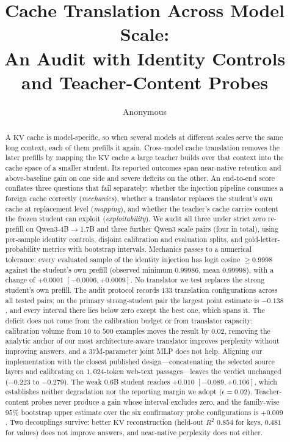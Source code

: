\documentclass{article} %
\title{Cache Translation Across Model Scale:\\
An Audit with Identity Controls and Teacher-Content Probes}
\author{Anonymous}
\date{}
\newcommand{\kv}{\ensuremath{\mathrm{KV}}}
\begin{document}
\maketitle

\begin{abstract}
A \kv{} cache is model-specific, so when several models at different scales
serve the same long context, each of them prefills it again. Cross-model cache
translation removes the later prefills by mapping the \kv{} cache a large
teacher builds over that context into the cache space of a smaller student.
Its reported outcomes span near-native retention and above-baseline gain on one
side and severe deficits on the other. An end-to-end score conflates three
questions that fail separately: whether the injection pipeline consumes a
foreign cache
correctly (\emph{mechanics}), whether a translator replaces the student's own cache
at replacement level (\emph{mapping}), and whether the teacher's cache carries
content the frozen student can exploit (\emph{exploitability}). We audit all
three under strict zero re-prefill on Qwen3-4B$\to$1.7B and three further Qwen3
scale pairs (four in total), using per-sample identity controls, disjoint
calibration and evaluation splits, and gold-letter-probability metrics with
bootstrap intervals. Mechanics passes to a numerical tolerance: every evaluated
sample of the identity injection has logit cosine $\ge 0.9998$ against the
student's own prefill (observed minimum $0.99986$, mean $0.99998$), with a change
of $+0.0001$ $[-0.0006,+0.0009]$.
No translator we test replaces the strong student's own prefill. The audit
protocol records $133$ translation configurations across all tested pairs; on
the primary strong-student pair the largest point estimate is $-0.138$, and
every interval there lies below zero except the best one, which spans it. The deficit does not come
from the calibration budget or from translator capacity:
calibration volume from $10$ to $500$ examples moves the result by $0.02$,
removing the analytic anchor of our most architecture-aware translator improves
perplexity without improving answers, and a $37$M-parameter joint MLP does not
help. Aligning our implementation with the closest published design---concatenating
the selected source layers and calibrating on $1{,}024$-token web-text
passages---leaves the verdict unchanged ($-0.223$ to $-0.279$). The weak $0.6$B
student reaches $+0.010$ $[-0.089,+0.106]$, which establishes neither
degradation nor the reporting margin we adopt ($\epsilon{=}0.02$).
Teacher-content probes never produce a gain whose interval excludes zero, and the
family-wise $95\%$ bootstrap upper estimate over the six confirmatory probe
configurations is $+0.009$. Two decouplings survive: better \kv{}
reconstruction (held-out $R^2$ $0.854$ for keys, $0.481$ for values) does not
improve answers, and near-native perplexity does not either.
\end{abstract}
\end{document}

